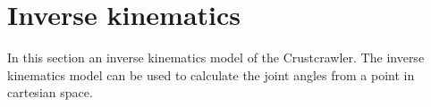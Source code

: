 \section{Inverse kinematics}\label{st:IK}
In this section an inverse kinematics model of the Crustcrawler. The inverse kinematics model can be used to calculate the joint angles from a point in cartesian space.